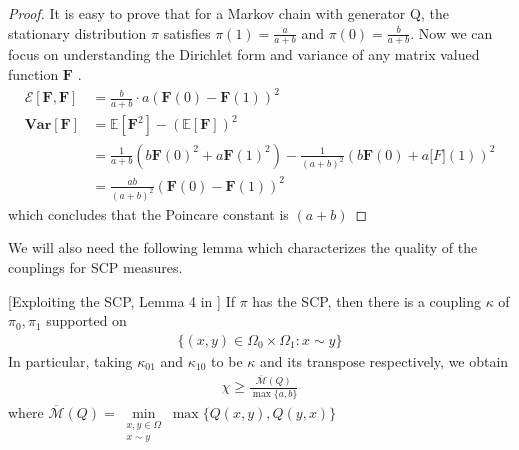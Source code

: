   \begin{proof}
    It is easy to prove that for a Markov chain with generator Q, the stationary distribution $\pi$ satisfies $\pi(1)=\frac{a}{a+b}$ and $\pi(0)=\frac{b}{a+b}$.
    Now we can focus on understanding the Dirichlet form and variance of any matrix valued function $\mathbf{F}$ .
    \begin{align*}
      \mathcal{E}[\mathbf{F},\mathbf{F}] &= \frac{b}{a+b}\cdot a(\mathbf{F}(0)-\mathbf{F}(1))^2\\
      \mathbf{Var}[\mathbf{F}] &= \mathbb{E}[\mathbf{F}^2] - (\mathbb{E}[\mathbf{F}])^2\\
      &=\frac{1}{a+b}(b\mathbf{F}(0)^2 + a\mathbf{F}(1)^2) - \frac{1}{(a+b)^2}(b\mathbf{F}(0) + a\mathbf[F](1))^2\\
      &=\frac{ab}{(a+b)^2}(\mathbf{F}(0)-\mathbf{F}(1))^2
    \end{align*}
    which concludes that the Poincare constant is $(a+b)$
  \end{proof}
We will also need the following lemma which characterizes the quality of the couplings for SCP measures.
\begin{lemma}{[Exploiting the SCP, Lemma 4 in \cite{HS19}]}\label{lem:lem4} If $\pi$ has the SCP, then there is a coupling $\kappa$ of $\pi_0, \pi_1$ supported on
  \begin{align*}
    \{(x,y)\in \Omega_0 \times \Omega_1 : x \sim y\}
  \end{align*}
  In particular, taking $\kappa_{01}$ and $\kappa_{10}$ to be $\kappa$ and its transpose respectively, we obtain
  \begin{align*}
    \chi \geq \frac{\overline{\mathscr{M}}(Q)}{\max\{a,b\}}
  \end{align*}
  where $\overline{\mathscr{M}}(Q) = \min\limits_{\substack{x,y\in\Omega\\x\sim y}}\max\{Q(x,y),Q(y,x)\}$
\end{lemma}

